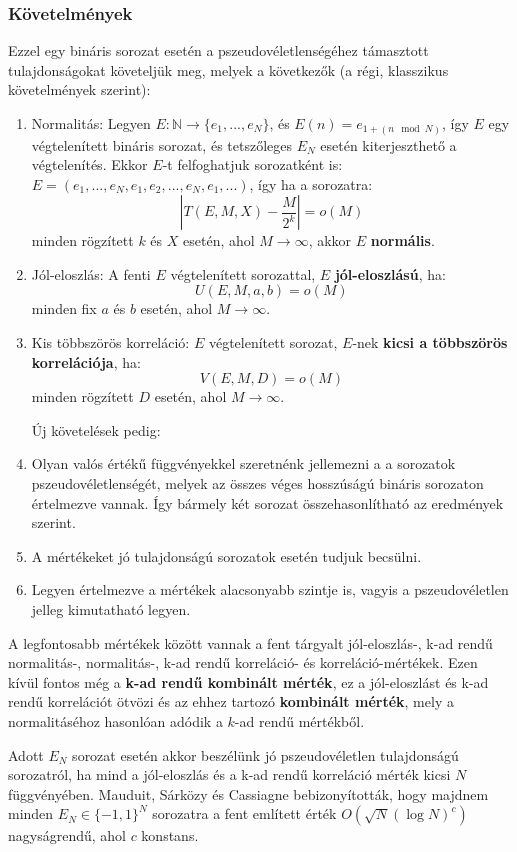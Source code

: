 \documentclass[12pt]{article}
\begin{document}
	\subsubsection*{Követelmények}
	Ezzel egy bináris sorozat esetén a pszeudovéletlenségéhez támasztott tulajdonságokat követeljük meg, melyek a következők (a régi, klasszikus követelmények szerint):
	\begin{enumerate}
		\bfseries \item Normalitás:
		\normalfont	Legyen $E: \mathbb{N} \to \{e_1, ..., e_N\}$, és $E(n) = e_{1+(n \mod N)}$, így $E$ egy végtelenített bináris sorozat, és tetszőleges $E_N$ esetén kiterjeszthető a végtelenítés. Ekkor $E$-t felfoghatjuk sorozatként is: $E=(e_1, ..., e_N, e_1, e_2, ..., e_N, e_1, ...)$, így ha a sorozatra:
		$$\left|T(E, M, X) - \frac{M}{2^k}\right| = o(M)$$
		minden rögzített $k$ és $X$ esetén, ahol $M \to \infty$, akkor $E$ \textbf{normális}.
		\par
		\bfseries \item Jól-eloszlás:
		\normalfont A fenti $E$ végtelenített sorozattal, $E$ \textbf{jól-eloszlású}, ha:
		$$U(E, M, a, b) = o (M)$$
		minden fix $a$ és $b$ esetén, ahol $M \to \infty$.
		\bfseries \item Kis többszörös korreláció:
		\normalfont $E$ végtelenített sorozat, $E$-nek \textbf{kicsi a többszörös korrelációja}, ha:
		$$V(E, M, D) = o(M)$$
		minden rögzített $D$ esetén, ahol $M \to \infty$. \par
		Új követelések pedig:
		\item Olyan valós értékű függvényekkel szeretnénk jellemezni a a sorozatok pszeudovéletlenségét, melyek az összes véges hosszúságú bináris sorozaton értelmezve vannak. Így bármely két sorozat összehasonlítható az eredmények szerint.
		\item A mértékeket jó tulajdonságú sorozatok esetén tudjuk becsülni.
		\item Legyen értelmezve a mértékek alacsonyabb szintje is, vagyis a pszeudovéletlen jelleg kimutatható legyen. 
	\end{enumerate}
	A legfontosabb mértékek között vannak a fent tárgyalt jól-eloszlás-, k-ad rendű normalitás-, normalitás-, k-ad rendű korreláció- és korreláció-mértékek. Ezen kívül fontos még a \textbf{k-ad rendű kombinált mérték}, ez a jól-eloszlást és k-ad rendű korrelációt ötvözi és az ehhez tartozó \textbf{kombinált mérték}, mely a normalitáséhoz hasonlóan adódik a $k$-ad rendű mértékből.
	
	Adott $E_N$ sorozat esetén akkor beszélünk jó pszeudovéletlen tulajdonságú sorozatról, ha mind a jól-eloszlás és a k-ad rendű korreláció mérték kicsi $N$ függvényében. Mauduit, Sárközy és Cassiagne bebizonyították, hogy majdnem minden $E_N \in \{-1, 1\}^N$ sorozatra a fent említett érték $O(\sqrt{N}(\log{N})^c)$ nagyságrendű, ahol $c$ konstans.
\end{document}
